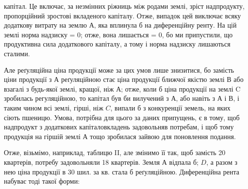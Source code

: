 \parcont{}  %
капітал. Це включає, за незмінних ріжниць між родами землі, зріст надпродукту,
пропорційний зростові вкладеного капіталу. Отже, випадок цей виключає всяку
додаткову витрату на землю $А$, яка вплинула б на диференційну ренту. На цій землі
норма надзиску = 0; отже, вона лишається = 0, бо ми припустили, що продуктивна
сила додаткового капіталу, а тому і норма надзиску лишаються сталими.

Але реґуляційна ціна продукції може за цих умов лише знизитися, бо замість
ціни продукції з $А$ реґуляційною стає ціна продукції ближчої якістю землі
В або взагалі з будь-якої землі, кращої, ніж $А$; отже, коли б ціна продукції
на землі C зробилась регуляційною, то капітал був би вилучений з $А$,
або навіть з $А$ і $В$, і таким чином всі землі, гірші, ніж $C$, випали б з конкуренції
земель, на яких сіють пшеницю. Умова, потрібна для цього за даних
припущень, є в тому, щоб надпродукт з додаткових капіталовкладень задовольняв
потребам, і щоб тому продукція на гіршій землі $А$ тощо зробилася
зайвою для поновлення подання.

Отже, візьмімо, наприклад, таблицю II, але змінимо її так, щоб замість 20
квартерів, потребу задовольняли 18 квартерів. Земля $А$ відпала б; $D$, а
разом з нею ціна продукції в 30 шил. за кв. стала б реґуляційною. Диференційна
рента набуває тоді такої форми:


